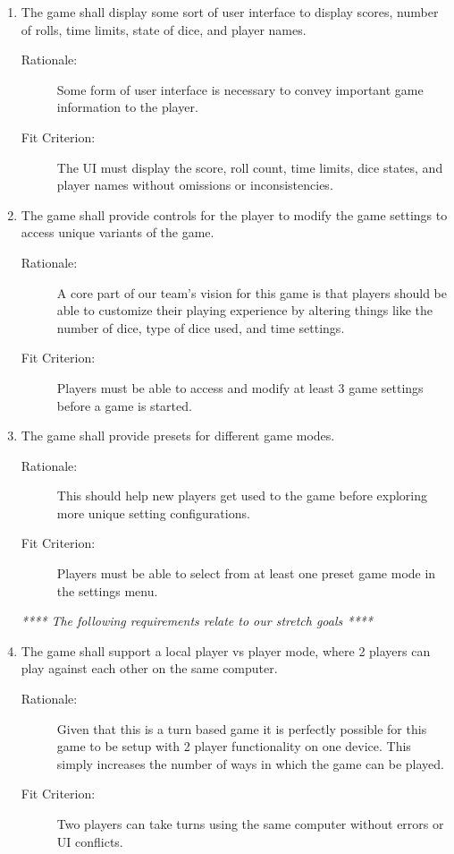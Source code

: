 \begin{enumerate}[label=R\arabic*, start=1, left=0pt]
    \item \label{R8} The game shall display some sort of user interface to display scores, number of rolls, time limits, state of dice, and player names.
    \begin{description}
        \item[Rationale:] Some form of user interface is necessary to convey important game information to the player.
        \item[Fit Criterion:] The UI must display the score, roll count, time limits, dice states, and player names without omissions or inconsistencies.
    \end{description}

    \item \label{R9} The game shall provide controls for the player to modify the game settings to access unique variants of the game.
    \begin{description}
        \item[Rationale:] A core part of our team's vision for this game is that players should be able to customize their playing experience by altering things like the number of dice, type of dice used, and time settings.
        \item[Fit Criterion:] Players must be able to access and modify at least 3 game settings before a game is started.
    \end{description}

    \item \label{R10} The game shall provide presets for different game modes.
    \begin{description}
        \item[Rationale:] This should help new players get used to the game before exploring more unique setting configurations.
        \item[Fit Criterion:] Players must be able to select from at least one preset game mode in the settings menu.
    \end{description}

    \textit{**** The following requirements relate to our stretch goals ****}
    \item \label{R11} The game shall support a local player vs player mode, where 2 players can play against each other on the same computer.
    \begin{description}
        \item[Rationale:] Given that this is a turn based game it is perfectly possible for this game to be setup with 2 player functionality on one device. This simply increases the number of ways in which the game can be played.
        \item[Fit Criterion:] Two players can take turns using the same computer without errors or UI conflicts.
    \end{description}


\end{enumerate}
